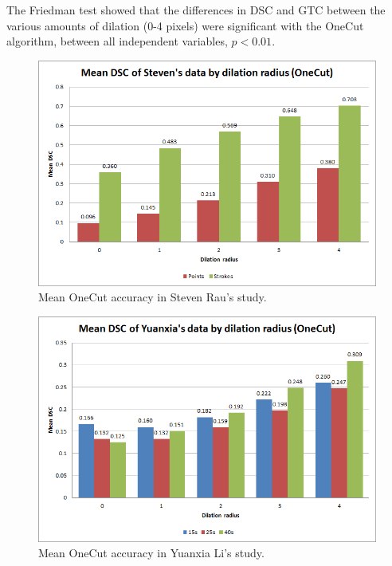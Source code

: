 \documentclass[12pt,a4paper,notitlepage]{article}
\begin{document}
The Friedman test showed that the differences in DSC and GTC between the various amounts of dilation (0-4 pixels) were significant with the OneCut algorithm, between all independent variables, $p < 0.01$.

\begin{figure}[H]
	\includegraphics[width=.9\linewidth]{steven_onecut_dsc}
	\caption{Mean OneCut accuracy in Steven Rau's study.}
	\label{fig:steven_onecut_dsc}
\end{figure}

\begin{figure}[H]
	\includegraphics[width=.9\linewidth]{yuanxia_onecut_dsc}
	\caption{Mean OneCut accuracy in Yuanxia Li's study.}
	\label{fig:yuanxia_onecut_dsc}
\end{figure}
\end{document}
